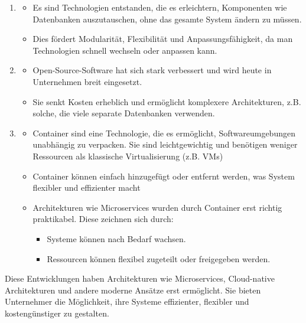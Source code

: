 \begin{infoBox}[title=Veränderungen in den letzten 10-15 Jahren]
    \begin{enumerate}
        \item {}
        \begin{itemize}
            \item Es sind Technologien entstanden, die es erleichtern, Komponenten wie Datenbanken auszutauschen, ohne das gesamte System ändern zu müssen.
            \item Dies fördert Modularität, Flexibilität und Anpassungsfähigkeit, da man Technologien schnell wechseln oder anpassen kann.
        \end{itemize}
        \item {}
        \begin{itemize}
            \item Open-Source-Software hat sich stark verbessert und wird heute in Unternehmen breit eingesetzt.
            \item Sie senkt Kosten erheblich und ermöglicht komplexere Architekturen, z.B. solche, die viele separate Datenbanken verwenden.
        \end{itemize}
        \item {}
        \begin{itemize}
            \item Container sind eine Technologie, die es ermöglicht, Softwareumgebungen unabhängig zu verpacken. Sie sind leichtgewichtig und benötigen weniger Ressourcen als klassische Virtualisierung (z.B. VMs)
            \item Container können einfach hinzugefügt oder entfernt werden, was System flexibler und effizienter macht
            \item {} Architekturen wie Microservices wurden durch Container erst richtig praktikabel. Diese zeichnen sich durch:
            \begin{itemize}
                \item {} Systeme können nach Bedarf wachsen.
                \item {} Ressourcen können flexibel zugeteilt oder freigegeben werden.
            \end{itemize}
        \end{itemize}
    \end{enumerate}
\end{infoBox}
\begin{infoBox}
    Diese Entwicklungen haben Architekturen wie Microservices, Cloud-native Architekturen und andere moderne Ansätze erst ermöglicht. Sie bieten Unternehmer die Möglichkeit, ihre Systeme effizienter, flexibler und kostengünstiger zu gestalten.
\end{infoBox}

